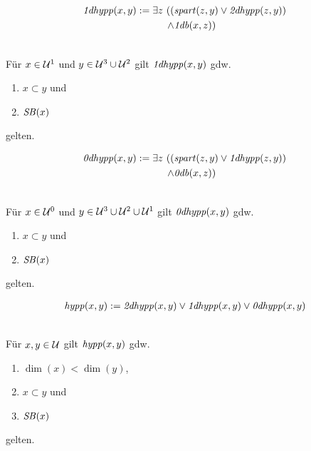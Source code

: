 \begin{erin}
    \begin{align*}
        \mathit{1dhypp}(x,y) := \exists z\ ((&\mathit{spart}(z,y) \vee \mathit{2dhypp}(z,y))\\
        \wedge  &\mathit{1db}(x,z))
    \end{align*}
\end{erin}

\begin{satz}\ \\
    Für $x \in \mathcal{U}^1$ und $y \in \mathcal{U}^3 \cup \mathcal{U}^2$ gilt $\mathit{1dhypp}(x,y)$ gdw. 
    \begin{enumerate}
        \item $x \subset y$ und
        \item $\mathit{S\hspace*{-0.25ex}B}(x)$
    \end{enumerate}
    gelten.
\end{satz}

\begin{erin}
    \begin{align*}
        \mathit{0dhypp}(x,y) := \exists z\ ((&\mathit{spart}(z,y) \vee \mathit{1dhypp}(z,y))\\ 
        \wedge  &\mathit{0db}(x,z))
    \end{align*}
\end{erin}

\begin{satz}\ \\
    Für $x \in \mathcal{U}^0$ und $y \in \mathcal{U}^3 \cup \mathcal{U}^2 \cup \mathcal{U}^1$ gilt $\mathit{0dhypp}(x,y)$ gdw. 
    \begin{enumerate}
        \item $x \subset y$ und
        \item $\mathit{S\hspace*{-0.25ex}B}(x)$
    \end{enumerate}
    gelten.
\end{satz}
               
\begin{erin}
    \begin{align*}
        \mathit{hypp}(x,y) := \mathit{2dhypp}(x,y) \vee \mathit{1dhypp}(x,y) \vee \mathit{0dhypp}(x,y)
    \end{align*}
\end{erin}

\begin{satz}\ \\
    Für $x,y \in \mathcal{U}$ gilt $\mathit{hypp}(x,y)$ gdw. 
    \begin{enumerate}
        \item $\dim(x) < \dim(y)$,
        \item $x \subset y$ und
        \item $\mathit{S\hspace*{-0.25ex}B}(x)$
    \end{enumerate}
    gelten.
\end{satz}
  
